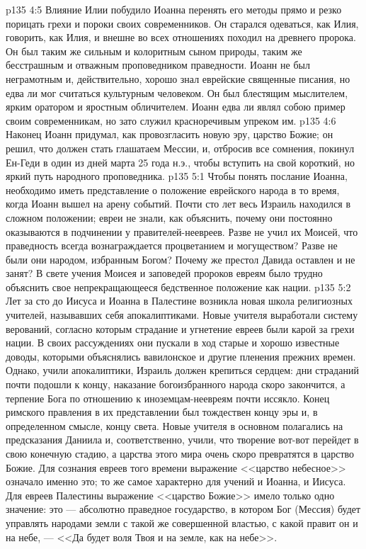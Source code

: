 \vs p135 4:5 Влияние Илии побудило Иоанна перенять его методы прямо и резко порицать грехи и пороки своих современников. Он старался одеваться, как Илия, говорить, как Илия, и внешне во всех отношениях походил на древнего пророка. Он был таким же сильным и колоритным сыном природы, таким же бесстрашным и отважным проповедником праведности. Иоанн не был неграмотным и, действительно, хорошо знал еврейские священные писания, но едва ли мог считаться культурным человеком. Он был блестящим мыслителем, ярким оратором и яростным обличителем. Иоанн едва ли являл собою пример своим современникам, но зато служил красноречивым упреком им.
\vs p135 4:6 Наконец Иоанн придумал, как провозгласить новую эру, царство Божие; он решил, что должен стать глашатаем Мессии, и, отбросив все сомнения, покинул Ен\hyp{}Геди в один из дней марта 25 года н.э., чтобы вступить на свой короткий, но яркий путь народного проповедника.
\vs p135 5:1 Чтобы понять послание Иоанна, необходимо иметь представление о положение еврейского народа в то время, когда Иоанн вышел на арену событий. Почти сто лет весь Израиль находился в сложном положении; евреи не знали, как объяснить, почему они постоянно оказываются в подчинении у правителей\hyp{}неевреев. Разве не учил их Моисей, что праведность всегда вознаграждается процветанием и могуществом? Разве не были они народом, избранным Богом? Почему же престол Давида оставлен и не занят? В свете учения Моисея и заповедей пророков евреям было трудно объяснить свое непрекращающееся бедственное положение как нации.
\vs p135 5:2 Лет за сто до Иисуса и Иоанна в Палестине возникла новая школа религиозных учителей, называвших себя апокалиптиками. Новые учителя выработали систему верований, согласно которым страдание и угнетение евреев были карой за грехи нации. В своих рассуждениях они пускали в ход старые и хорошо известные доводы, которыми объяснялись вавилонское и другие пленения прежних времен. Однако, учили апокалиптики, Израиль должен крепиться сердцем: дни страданий почти подошли к концу, наказание богоизбранного народа скоро закончится, а терпение Бога по отношению к иноземцам\hyp{}неевреям почти иссякло. Конец римского правления в их представлении был тождествен концу эры и, в определенном смысле, концу света. Новые учителя в основном полагались на предсказания Даниила и, соответственно, учили, что творение вот\hyp{}вот перейдет в свою конечную стадию, а царства этого мира очень скоро превратятся в царство Божие. Для сознания евреев того времени выражение <<царство небесное>> означало именно это; то же самое характерно для учений и Иоанна, и Иисуса. Для евреев Палестины выражение <<царство Божие>> имело только одно значение: это --- абсолютно праведное государство, в котором Бог (Мессия) будет управлять народами земли с такой же совершенной властью, с какой правит он и на небе, --- <<Да будет воля Твоя и на земле, как на небе>>.
